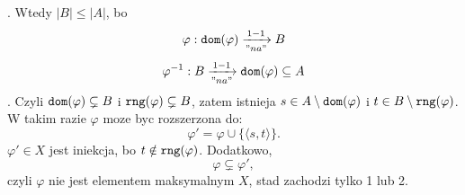 \documentclass{article}
\begin{document}
    . Wtedy $|B|\leq|A|$, bo
    $$\varphi:\texttt{dom}(\varphi)\xrightarrow["na"]{1-1} B$$
    $$\varphi^{-1}:B\xrightarrow["na"]{1-1}\texttt{dom}(\varphi)\subseteq A$$
    . Czyli $\texttt{dom}(\varphi)\subsetneq B$ i $\texttt{rng}(\varphi)\subsetneq B$, zatem istnieja $s\in A\setminus\texttt{dom}(\varphi)$ i $t\in B\setminus\texttt{rng}(\varphi)$. W takim razie $\varphi$ moze byc rozszerzona do:
    $$\varphi'=\varphi\cup\{\langle s,t\rangle\}.$$
    $\varphi'\in X$ jest iniekcja, bo $t\notin\texttt{rng}(\varphi)$. Dodatkowo,
    $$\varphi\subsetneq\varphi',$$
    czyli $\varphi$ nie jest elementem maksymalnym $X$, stad {\color{acc}zachodzi tylko 1 lub 2}.\kondow
\end{document}

